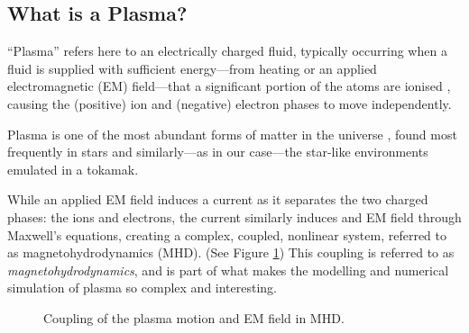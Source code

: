\subsection*{What is a Plasma?}
    \noindent\makebox[\linewidth]{\rule{\textwidth}{0.4pt}}
    \begin{definition}[Plasma]
        ``Plasma'' refers here to an electrically charged fluid, typically occurring when a fluid is supplied with sufficient energy—from heating or an applied electromagnetic (EM) field—that a significant portion of the atoms  are ionised , causing the (positive) ion and (negative) electron phases to move independently.
    \end{definition}
    \noindent\makebox[\linewidth]{\rule{\textwidth}{0.4pt}}
    Plasma is one of the most abundant forms of matter in the universe \cite{CL13}, found most frequently in stars \cite{Phi95, Asc06, Pie17} and similarly—as in our case—the star-like environments emulated in a tokamak.
    
    While an applied EM field induces a current as it separates the two charged phases: the ions and electrons, the current similarly induces and EM field through Maxwell's equations, creating a complex, coupled, nonlinear system, referred to as magnetohydrodynamics (MHD). (See Figure \ref{fig:MHD coupling}) \BA{[Ref.]} This coupling is referred to as \emph{magnetohydrodynamics}, and is part of what makes the modelling and numerical simulation of plasma so complex and interesting.
    \begin{figure}[!h]
        \centering
        \caption{Coupling of the plasma motion and EM field in MHD.}
        \label{fig:MHD coupling}
    \end{figure}
    